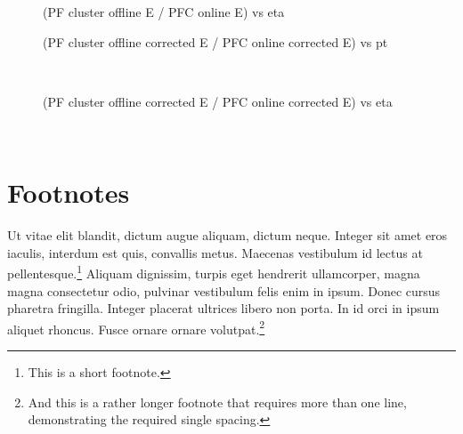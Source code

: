 \begin{figure}[ht]
\caption{(PF cluster offline E / PFC online E) vs eta}
\end{figure}
\begin{figure}[ht]
\caption{(PF cluster offline corrected E / PFC online corrected E) vs pt}
\end{figure}~

\begin{figure}[ht]
\caption{(PF cluster offline corrected E / PFC online corrected E) vs eta}
\end{figure}~

\section{Footnotes}

Ut vitae elit blandit, dictum augue aliquam, dictum neque. Integer sit amet eros
iaculis, interdum est quis, convallis metus. Maecenas vestibulum id lectus at
pellentesque.\footnote{This is a short footnote.} Aliquam dignissim, turpis eget
hendrerit ullamcorper, magna magna consectetur odio, pulvinar vestibulum felis
enim in ipsum. Donec cursus pharetra fringilla. Integer placerat ultrices libero
non porta. In id orci in ipsum aliquet rhoncus. Fusce ornare ornare
volutpat.\footnote{And this is a rather longer footnote that requires more than
one line, demonstrating the required single spacing.}

